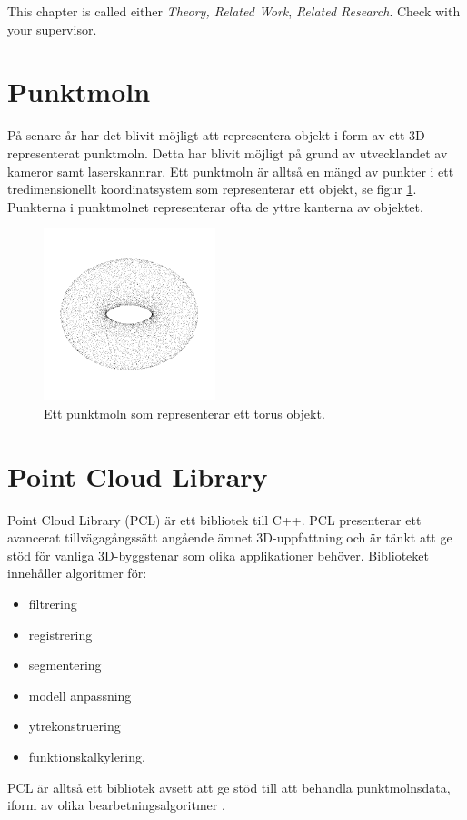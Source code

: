 This chapter is called either \emph{Theory, Related Work}, 
\emph{Related Research}. Check with your supervisor.
\newpage










\section{Punktmoln}
På senare år har det blivit möjligt att representera objekt i form av ett 3D-representerat punktmoln. Detta har blivit möjligt på grund av utvecklandet av kameror samt laserskannrar. Ett punktmoln är alltså en mängd av punkter i ett tredimensionellt koordinatsystem som representerar ett objekt, se figur \ref{fig:point_cloud_torus}. Punkterna i punktmolnet representerar ofta de yttre kanterna av objektet.

\begin{figure}[H]
	\centering
	\includegraphics[width=50mm]{figures/Point_cloud_torus.png}
	\caption{Ett punktmoln som representerar ett torus objekt.}
	\label{fig:point_cloud_torus}
\end{figure}


\section{Point Cloud Library}
Point Cloud Library (PCL) är ett bibliotek till C++. PCL presenterar ett avancerat tillvägagångssätt angående ämnet 3D-uppfattning och är tänkt att ge stöd för vanliga 3D-byggstenar som olika applikationer behöver. Biblioteket innehåller algoritmer för:

\begin{itemize}
	\item filtrering
	\item registrering
	\item segmentering
	\item modell anpassning
	\item ytrekonstruering
	\item funktionskalkylering.
\end{itemize}
PCL är alltså ett bibliotek avsett att ge stöd till att behandla punktmolnsdata, iform av olika bearbetningsalgoritmer \cite{rusu20113d}.

